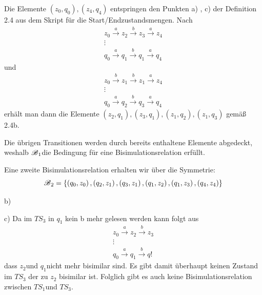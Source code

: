 \documentclass[12pt, paper=a4]{article}
\begin{document}
Die Elemente $\left(z_{0},q_{0}\right),\left(z_{4},q_{4}\right)$
entspringen den Punkten a) , c) der Definition 2.4 aus dem Skript
für die Start/Endzustandsmengen. Nach
\begin{gather*}
z_{0}\stackrel{a}{\rightarrow}z_{2}\stackrel{b}{\rightarrow}z_{3}\stackrel{a}{\rightarrow}z_{4}\\
\vdots\\
q_{0}\stackrel{a}{\rightarrow}q_{1}\stackrel{b}{\rightarrow}q_{1}\stackrel{a}{\rightarrow}q_{4}
\end{gather*}
und
\begin{gather*}
z_{0}\stackrel{b}{\rightarrow}z_{1}\stackrel{b}{\rightarrow}z_{1}\stackrel{a}{\rightarrow}z_{4}\\
\vdots\\
q_{0}\stackrel{a}{\rightarrow}q_{2}\stackrel{b}{\rightarrow}q_{3}\stackrel{a}{\rightarrow}q_{4}
\end{gather*}
erhält man dann die Elemente $\left(z_{2},q_{1}\right),\left(z_{3},q_{1}\right),\left(z_{1},q_{2}\right),\left(z_{1},q_{3}\right)$
gemäß 2.4b.

Die übrigen Transitionen werden durch bereits enthaltene Elemente
abgedeckt, weshalb $\text{\ensuremath{\mathscr{B}}}_{1}$die Bedingung
für eine Bisimulationsrelation erfüllt.

Eine zweite Bisimulationsrelation erhalten wir über die Symmetrie:
\[
\text{\ensuremath{\mathscr{B}}}_{2}=\left\{ \left(q_{0},z_{0}\right),\left(q_{2},z_{1}\right),\left(q_{3},z_{1}\right),\left(q_{1},z_{2}\right),\left(q_{1},z_{3}\right),\left(q_{4},z_{4}\right)\right\} 
\]


b)

c)  Da im $TS_{3}$ in $q_{1}$ kein b mehr gelesen werden kann folgt
aus 
\begin{gather*}
z_{0}\stackrel{a}{\rightarrow}z_{2}\stackrel{b}{\rightarrow}z_{3}\\
\vdots\\
q_{0}\stackrel{a}{\rightarrow}q_{1}\stackrel{b}{\rightarrow}q!
\end{gather*}
dass $z_{2}$und $q_{1}$nicht mehr bisimilar sind. Es gibt damit
überhaupt keinen Zustand im $TS_{3}$ der zu $z_{2}$ bisimilar ist.
Folglich gibt es auch keine Bisimulationsrelation zwischen $TS_{1}$und
$TS_{3}$.
\end{document}
